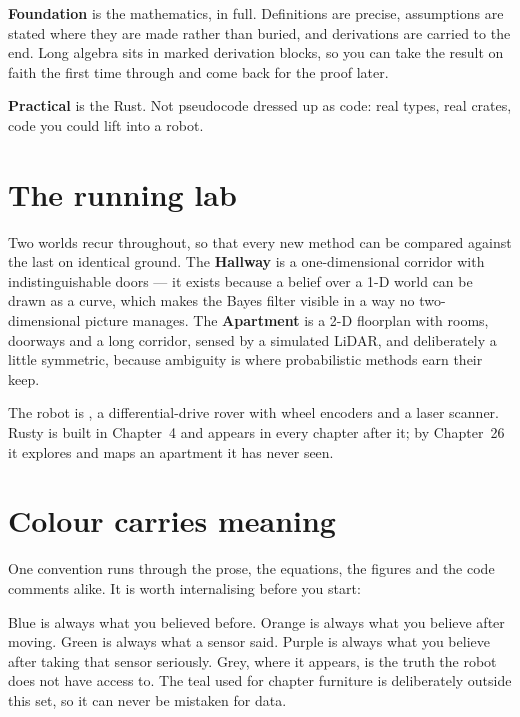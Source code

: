 \documentclass[11pt, twoside, openright]{book}
\begin{document}
\textbf{Foundation} is the mathematics, in full. Definitions are precise,
assumptions are stated where they are made rather than buried, and derivations
are carried to the end. Long algebra sits in marked derivation blocks, so you
can take the result on faith the first time through and come back for the proof
later.

\textbf{Practical} is the Rust. Not pseudocode dressed up as code: real types,
real crates, code you could lift into a robot.

\section*{The running lab}

Two worlds recur throughout, so that every new method can be compared against
the last on identical ground. The \textbf{Hallway} is a one-dimensional corridor
with indistinguishable doors --- it exists because a belief over a 1-D world can
be drawn as a curve, which makes the Bayes filter visible in a way no
two-dimensional picture manages. The \textbf{Apartment} is a 2-D floorplan with
rooms, doorways and a long corridor, sensed by a simulated LiDAR, and
deliberately a little symmetric, because ambiguity is where probabilistic
methods earn their keep.

The robot is , a differential-drive rover with wheel encoders
and a laser scanner. Rusty is built in Chapter~4 and appears in every chapter
after it; by Chapter~26 it explores and maps an apartment it has never seen.

\section*{Colour carries meaning}

One convention runs through the prose, the equations, the figures and the code
comments alike. It is worth internalising before you start:

\shcolorkey

\noindent
Blue is always what you believed before. Orange is always what you believe after
moving. Green is always what a sensor said. Purple is always what you believe
after taking that sensor seriously. Grey, where it appears, is the truth the
robot does not have access to. The teal used for chapter furniture is
deliberately outside this set, so it can never be mistaken for data.

\cleardoublepage
\setcounter{tocdepth}{0}
\renewcommand{\contentsname}{Contents}
\tableofcontents
\end{document}

